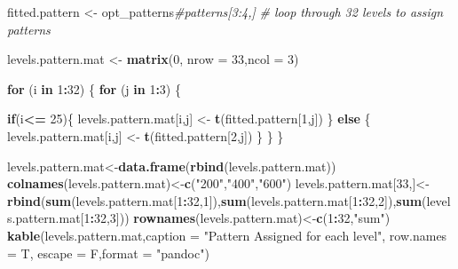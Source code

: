 \documentclass[
]{article}
\newenvironment{Shaded}{\begin{snugshade}}{\end{snugshade}}
\newcommand{\CommentTok}[1]{\textcolor[rgb]{0.56,0.35,0.01}{\textit{#1}}}
\newcommand{\ControlFlowTok}[1]{\textcolor[rgb]{0.13,0.29,0.53}{\textbf{#1}}}
\newcommand{\DataTypeTok}[1]{\textcolor[rgb]{0.13,0.29,0.53}{#1}}
\newcommand{\DecValTok}[1]{\textcolor[rgb]{0.00,0.00,0.81}{#1}}
\newcommand{\KeywordTok}[1]{\textcolor[rgb]{0.13,0.29,0.53}{\textbf{#1}}}
\newcommand{\NormalTok}[1]{#1}
\newcommand{\OperatorTok}[1]{\textcolor[rgb]{0.81,0.36,0.00}{\textbf{#1}}}
\newcommand{\StringTok}[1]{\textcolor[rgb]{0.31,0.60,0.02}{#1}}
\begin{document}
\begin{Shaded}
\begin{Highlighting}[]
\NormalTok{fitted.pattern <-}\StringTok{ }\NormalTok{opt_patterns}\CommentTok{#patterns[3:4,]}
\CommentTok{# loop through 32 levels to assign patterns}

\NormalTok{levels.pattern.mat <-}\StringTok{ }\KeywordTok{matrix}\NormalTok{(}\DecValTok{0}\NormalTok{,  }\DataTypeTok{nrow =} \DecValTok{33}\NormalTok{,}\DataTypeTok{ncol =} \DecValTok{3}\NormalTok{)}

\ControlFlowTok{for}\NormalTok{ (i }\ControlFlowTok{in} \DecValTok{1}\OperatorTok{:}\DecValTok{32}\NormalTok{) \{}
  \ControlFlowTok{for}\NormalTok{ (j }\ControlFlowTok{in} \DecValTok{1}\OperatorTok{:}\DecValTok{3}\NormalTok{) \{}
    
  \ControlFlowTok{if}\NormalTok{(i}\OperatorTok{<=}\StringTok{ }\DecValTok{25}\NormalTok{)\{}
\NormalTok{    levels.pattern.mat[i,j] <-}\StringTok{ }\KeywordTok{t}\NormalTok{(fitted.pattern[}\DecValTok{1}\NormalTok{,j])}
\NormalTok{  \} }\ControlFlowTok{else}\NormalTok{ \{}
\NormalTok{     levels.pattern.mat[i,j] <-}\StringTok{ }\KeywordTok{t}\NormalTok{(fitted.pattern[}\DecValTok{2}\NormalTok{,j])}
\NormalTok{   \}}
\NormalTok{  \}}
\NormalTok{\}}




\NormalTok{levels.pattern.mat<-}\KeywordTok{data.frame}\NormalTok{(}\KeywordTok{rbind}\NormalTok{(levels.pattern.mat)) }
\KeywordTok{colnames}\NormalTok{(levels.pattern.mat)<-}\KeywordTok{c}\NormalTok{(}\StringTok{"200"}\NormalTok{,}\StringTok{"400"}\NormalTok{,}\StringTok{"600"}\NormalTok{)}
\NormalTok{levels.pattern.mat[}\DecValTok{33}\NormalTok{,]<-}\KeywordTok{rbind}\NormalTok{(}\KeywordTok{sum}\NormalTok{(levels.pattern.mat[}\DecValTok{1}\OperatorTok{:}\DecValTok{32}\NormalTok{,}\DecValTok{1}\NormalTok{]),}\KeywordTok{sum}\NormalTok{(levels.pattern.mat[}\DecValTok{1}\OperatorTok{:}\DecValTok{32}\NormalTok{,}\DecValTok{2}\NormalTok{]),}\KeywordTok{sum}\NormalTok{(levels.pattern.mat[}\DecValTok{1}\OperatorTok{:}\DecValTok{32}\NormalTok{,}\DecValTok{3}\NormalTok{]))}
\KeywordTok{rownames}\NormalTok{(levels.pattern.mat)<-}\KeywordTok{c}\NormalTok{(}\DecValTok{1}\OperatorTok{:}\DecValTok{32}\NormalTok{,}\StringTok{"sum"}\NormalTok{)}
\KeywordTok{kable}\NormalTok{(levels.pattern.mat,}\DataTypeTok{caption =} \StringTok{"Pattern Assigned for each level"}\NormalTok{, }\DataTypeTok{row.names =}\NormalTok{ T, }\DataTypeTok{escape =}\NormalTok{ F,}\DataTypeTok{format =} \StringTok{"pandoc"}\NormalTok{)}
\end{Highlighting}
\end{Shaded}
\end{document}
